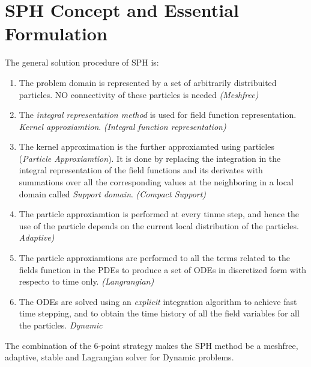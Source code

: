 \documentclass[12pt]{thesis}
\begin{document}
\section{SPH Concept and Essential Formulation}
The general solution procedure of SPH is:
\begin{enumerate}
\item The problem domain is represented by a set of arbitrarily distribuited particles. NO connectivity of these particles is needed \textit{(Meshfree)}
\item The \textit{integral representation method} is used for field function representation. \textit{Kernel approxiamtion}. \textit{(Integral function representation)}
\item The kernel approximation is the further approxiamted using particles (\textit{Particle Approxiamtion}). It is done by replacing the integration in the integral representation of the field functions and its derivates with summations over all the corresponding values at the neighboring in a local domain called \textit{Support domain}. \textit{(Compact Support)}
\item The particle approxiamtion is performed at every tinme step, and hence the use of the particle depends on the current local distribution of the particles. \textit{Adaptive)}
\item The particle approxiamtions are performed to all the terms related to the fields function in the PDEs to produce a set of ODEs in discretized form with respecto to time only. \textit{(Langrangian)}
\item The ODEs are solved using an \textit{explicit} integration algorithm to achieve fast time stepping, and to obtain the time history of all the field variables for all the particles. \textit{Dynamic}
\end{enumerate}
The combination of the 6-point strategy makes the SPH method be a meshfree, adaptive, stable and Lagrangian solver for Dynamic problems.
\end{document}
